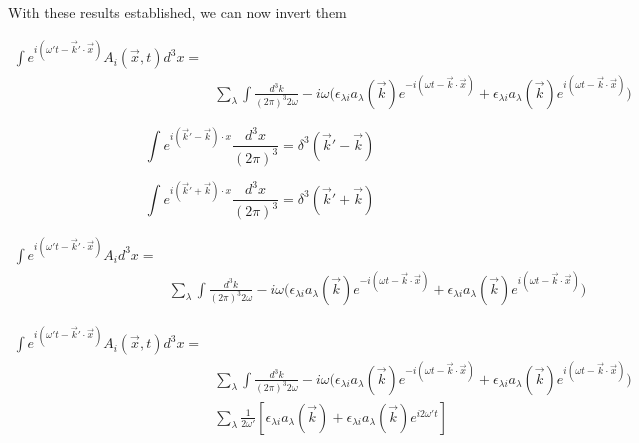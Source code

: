\documentclass[a4]{article}
\begin{document}
    With these results established, we can now invert them

    \begin{equation}
        \begin{aligned}
            \int e^{i (\omega' t - \vec{k}' \cdot \vec{x})} A_{i} (\vec{x}, t) d^{3} x = & \\
            & \sum_{\lambda} \int \frac{d^{3} k}{(2 \pi)^{3} 2 \omega} - i \omega \bigg( \epsilon_{\lambda i} a_{\lambda} (\vec{k}) e^{- i (\omega t - \vec{k} \cdot \vec{x})} + \epsilon_{\lambda i} a_{\lambda} (\vec{k}) e^{i (\omega t - \vec{k} \cdot \vec{x})} \bigg)
        \end{aligned}
    \end{equation}

    \begin{equation}
        \int e^{i (\vec{k}' - \vec{k}) \cdot x} \frac{d^{3} x}{(2 \pi)^{3}} = \delta^{3} (\vec{k}' - \vec{k})
    \end{equation}

    \begin{equation}
        \int e^{i (\vec{k}' + \vec{k}) \cdot x} \frac{d^{3} x}{(2 \pi)^{3}} = \delta^{3} (\vec{k}' + \vec{k})
    \end{equation}

    \begin{equation}
        \begin{aligned}
            \int e^{i (\omega' t - \vec{k}' \cdot \vec{x})} A_{i} d^{3} x = & \\
            & \sum_{\lambda} \int \frac{d^{3} k}{(2 \pi)^{3} 2 \omega} - i \omega \bigg( \epsilon_{\lambda i} a_{\lambda} (\vec{k}) e^{- i (\omega t - \vec{k} \cdot \vec{x})} + \epsilon_{\lambda i} a_{\lambda} (\vec{k}) e^{i (\omega t - \vec{k} \cdot \vec{x})} \bigg)
        \end{aligned}
    \end{equation}

    \begin{equation}
        \begin{aligned}
            \int e^{i (\omega' t - \vec{k}' \cdot \vec{x})} A_{i} (\vec{x}, t) d^{3} x = & \\
            & \sum_{\lambda} \int \frac{d^{3} k}{(2 \pi)^{3} 2 \omega} - i \omega \bigg( \epsilon_{\lambda i} a_{\lambda} (\vec{k}) e^{- i (\omega t - \vec{k} \cdot \vec{x})} + \epsilon_{\lambda i} a_{\lambda} (\vec{k}) e^{i (\omega t - \vec{k} \cdot \vec{x})} \bigg) \\
            & \sum_{\lambda} \frac{1}{2 \omega'} [\epsilon_{\lambda i} a_{\lambda} (\vec{k}) + \epsilon_{\lambda i} a_{\lambda} (\vec{k}) e^{i2 \omega' t}]
        \end{aligned}
    \end{equation}
\end{document}
